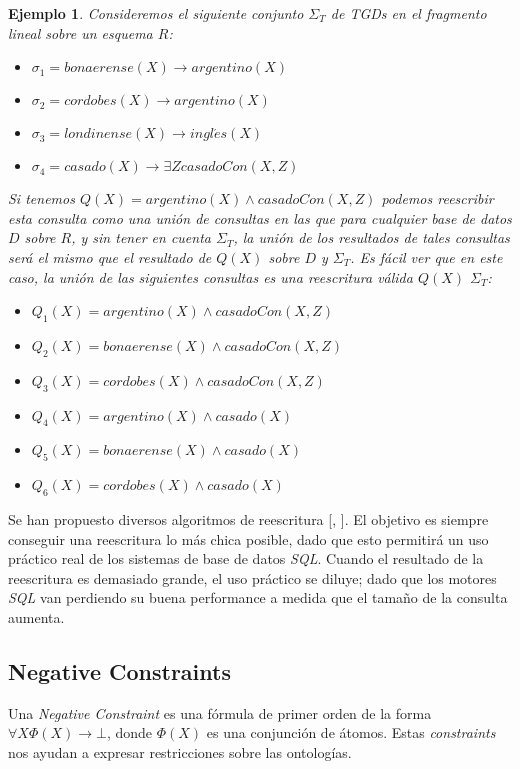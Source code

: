 \documentclass[11pt,a4paper,twoside]{tesis}
\newtheorem{exmp}{Ejemplo}
\begin{document}
\begin{exmp}\label{ejemplo_rewrite}
Consideremos el siguiente conjunto $\Sigma_T$ de TGDs en el fragmento \textit{lineal} sobre un esquema $R$:
    \begin{itemize}
        \item $\sigma_1 = bonaerense(X) \rightarrow argentino(X)$
        \item $\sigma_2 = cordobes(X) \rightarrow argentino(X)$
        \item $\sigma_3 = londinense(X) \rightarrow ingl\acute{e}s(X)$
        \item $\sigma_4 = casado(X) \rightarrow \exists Z casadoCon(X, Z)$
    \end{itemize}
Si tenemos $Q(X) = argentino(X) \land casadoCon(X, Z)$ podemos reescribir esta consulta como una unión de consultas en las que para cualquier base de datos $D$ sobre $R$, y sin tener en cuenta $\Sigma_T$, la unión de los resultados de tales consultas será el mismo que el resultado de $Q(X)$ sobre $D$ y $\Sigma_T$. Es fácil ver que en este caso, la unión de las siguientes consultas es una reescritura válida $Q(X)$ $\Sigma_T$:

    \begin{itemize}
        \item $Q_1(X) = argentino(X) \land casadoCon(X, Z)$
        \item $Q_2(X) = bonaerense(X) \land casadoCon(X, Z)$
        \item $Q_3(X) = cordobes(X) \land casadoCon(X, Z)$
        \item $Q_4(X) = argentino(X) \land casado(X)$
        \item $Q_5(X) = bonaerense(X) \land casado(X)$
        \item $Q_6(X) = cordobes(X) \land casado(X)$
    \end{itemize}
\end{exmp}

Se han propuesto diversos algoritmos de reescritura [\cite{Kewen}, \cite{Gottlob}]. El objetivo es siempre conseguir una reescritura lo más chica posible, dado que esto permitirá un uso práctico real de los sistemas de base de datos \textit{SQL}. Cuando el resultado de la reescritura es demasiado grande, el uso práctico se diluye; dado que los motores \textit{SQL} van perdiendo su buena performance a medida que el tamaño de la consulta aumenta. 

\subsection{Negative Constraints}\label{ncs}
Una \textit{Negative Constraint} es una fórmula de primer orden de la forma $\forall X \Phi (X) \rightarrow \bot$, donde $\Phi(X)$ es una conjunción de átomos. Estas \textit{constraints} nos ayudan a expresar restricciones sobre las ontologías.
\end{document}
